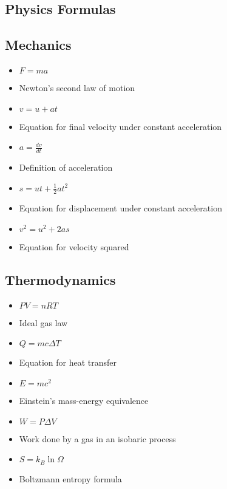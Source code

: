\documentclass[10pt]{article}
\begin{document}
        \begin{multicols*}{3}  %
\section*{Physics Formulas}\subsection*{Mechanics}
\begin{itemize}\footnotesize
        \item $F = ma$
\item[] Newton's second law of motion
\item $v = u + at$
\item[] Equation for final velocity under constant acceleration
\item $a = \frac{dv}{dt}$
\item[] Definition of acceleration
\item $s = ut + \frac{1}{2} a t^2$
\item[] Equation for displacement under constant acceleration
\item $v^2 = u^2 + 2as$
\item[] Equation for velocity squared
\end{itemize}
        \subsection*{Thermodynamics}
\begin{itemize}\footnotesize
        \item $PV = nRT$
\item[] Ideal gas law
\item $Q = mc\Delta T$
\item[] Equation for heat transfer
\item $E = mc^2$
\item[] Einstein's mass-energy equivalence
\item $W = P \Delta V$
\item[] Work done by a gas in an isobaric process
\item $S = k_B \ln \Omega$
\item[] Boltzmann entropy formula
\end{itemize}

\end{multicols*}
\end{document}
